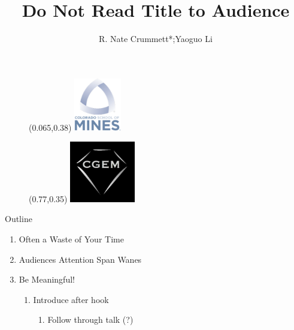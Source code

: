 \documentclass[aspectratio=169]{beamer}
\title{Do Not Read Title to Audience}
\author{R. Nate Crummett*;Yaoguo Li}
\begin{document}
  \begin{frame}[plain]
    \begin{figure}
      \begin{textblock*}{2.05cm}(0.065\paperwidth,0.38\paperheight)
        \includegraphics[width=2.05cm]{mines-2018}
      \end{textblock*}
    \end{figure}
    \begin{figure}
      \begin{textblock*}{2.85cm}(0.77\paperwidth,0.35\paperheight)
        \includegraphics[width=2.85cm]{cgem-logo}
      \end{textblock*}
    \end{figure}
    \maketitle{1cm}{1.2cm}{2mm}{-5mm}
  \end{frame}

  \begin{frame}{Outline}
    \begin{enumerate}
      \item Often a Waste of Your Time
      \item Audiences Attention Span Wanes
      \item Be Meaningful! \\[1mm]
      \begin{enumerate}
        \item Introduce after hook \\[2mm]
        \begin{enumerate}
          \item Follow through talk (?)
        \end{enumerate}
      \end{enumerate}
    \end{enumerate}
  \end{frame}
 
\end{document}
